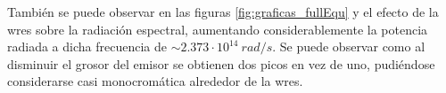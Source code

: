 También se puede observar en las figuras \ref{fig:graficas_fullEqu}  y  el efecto de la \acrshort{wres} sobre la radiación espectral, aumentando considerablemente la potencia radiada a dicha frecuencia de $\sim 2.373\cdot 10^{14} \ rad/s$. Se puede observar como al disminuir el grosor del emisor se obtienen dos picos en vez de uno, pudiéndose considerarse casi monocromática alrededor de la \acrshort{wres}.\\\\
\vfill
